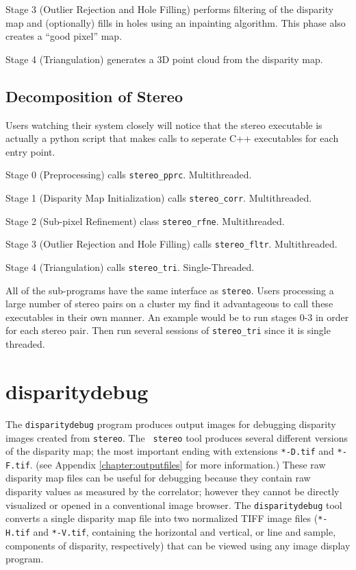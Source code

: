Stage 3 (Outlier Rejection and Hole Filling) performs filtering of the
disparity map and (optionally) fills in holes using an inpainting
algorithm.  This phase also creates a ``good pixel'' map.

Stage 4 (Triangulation) generates a 3D point cloud from the disparity
map.

\subsection{Decomposition of Stereo}

Users watching their system closely will notice that the stereo
executable is actually a python script that makes calls to seperate
C++ executables for each entry point.

Stage 0 (Preprocessing) calls \texttt{stereo\_pprc}. Multithreaded.

Stage 1 (Disparity Map Initialization) calls
\texttt{stereo\_corr}. Multithreaded.

Stage 2 (Sub-pixel Refinement) class \texttt{stereo\_rfne}. Multithreaded.

Stage 3 (Outlier Rejection and Hole Filling) calls
\texttt{stereo\_fltr}. Multithreaded.

Stage 4 (Triangulation) calls \texttt{stereo\_tri}. Single-Threaded.

All of the sub-programs have the same interface as
\texttt{stereo}. Users processing a large number of stereo pairs on a
cluster my find it advantageous to call these executables in their own
manner. An example would be to run stages 0-3 in order for each stereo
pair. Then run several sessions of \texttt{stereo\_tri} since it is
single threaded.

\section{disparitydebug}
\label{disparitydebug}

The \texttt{disparitydebug} program produces output images for
debugging disparity images created from \verb#stereo#. The {\tt
stereo} tool produces several different versions of the disparity
map; the most important ending with extensions \verb#*-D.tif# and
\verb#*-F.tif#. (see Appendix \ref{chapter:outputfiles} for more
information.)  These raw disparity map files can be useful for
debugging because they contain raw disparity values as measured by
the correlator; however they cannot be directly visualized or opened
in a conventional image browser.  The \verb#disparitydebug# tool
converts a single disparity map file into two normalized TIFF image
files (\verb#*-H.tif# and \verb#*-V.tif#, containing the horizontal
and vertical, or line and sample, components of disparity, respectively)
that can be viewed using any image display program.

